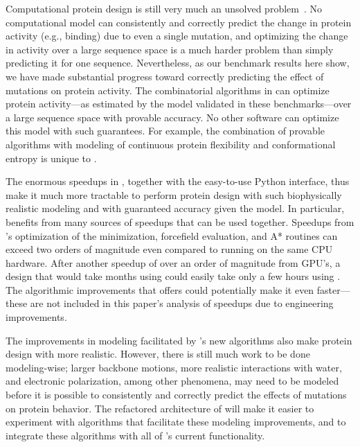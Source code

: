 Computational protein design is still very much an unsolved problem~\cite{alg_SMB_textbook,cosb_design}.  No computational model can consistently and correctly predict the change in protein activity (e.g., binding) due to even a single mutation, and optimizing the change in activity over a large sequence space is a much harder problem than simply predicting it for one sequence.  Nevertheless, as our benchmark results here show, we have made substantial progress toward correctly predicting the effect of mutations on protein activity.  The combinatorial algorithms in \osprey can optimize protein activity---as estimated by the model validated in these benchmarks---over a large sequence space with provable accuracy.  No other software can optimize this model with such guarantees.  For example, the combination of provable algorithms with modeling of continuous protein flexibility and conformational entropy is unique to \osprey.   

The enormous speedups in , together with the easy-to-use Python interface, thus make it much more tractable to perform protein design with such biophysically realistic modeling and with guaranteed accuracy given the model.  In particular,  benefits from many sources of speedups that can be used together.  Speedups from 's optimization of the minimization, forcefield evaluation, and A* routines can exceed two orders of magnitude even compared to  running on the same CPU hardware.  After another speedup of over an order of magnitude from GPU's, a design that would take months using  could easily take only a few hours using .  The algorithmic improvements that  offers could potentially make it even faster---these are not included in this paper's analysis of speedups due to engineering improvements.  

The improvements in modeling facilitated by 's new algorithms also make protein design with \osprey more realistic.  However, there is still much work to be done modeling-wise; larger backbone motions, more realistic interactions with water, and electronic polarization, among other phenomena, may need to be modeled before it is possible to consistently and correctly predict the effects of mutations on protein behavior.  The refactored architecture of  will make it easier to experiment with algorithms that facilitate these modeling improvements, and to integrate these algorithms with all of \osprey's current functionality.  


